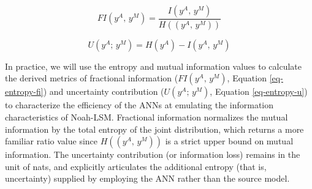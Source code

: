 \begin{equation}\label{eq-entropy-fi}
    FI(y^A,\,y^M) = \frac{I(y^A,\,y^M)}{H((y^A,\,y^M))} %
\end{equation}

\begin{equation}\label{eq-entropy-u}
    U(y^A;\,y^M) = H(y^A) - I(y^A,\,y^M) %
\end{equation}

In practice, we will use the entropy and mutual information values to calculate the derived metrics of fractional information ($FI(y^A,\,y^M)$, Equation \ref{eq-entropy-fi}) and uncertainty contribution ($U(y^A;\,y^M)$, Equation \ref{eq-entropy-u}) to characterize the efficiency of the ANNs at emulating the information characteristics of Noah-LSM. Fractional information normalizes the mutual information by the total entropy of the joint distribution, which returns a more familiar ratio value since $H((y^A,\,y^M))$ is a strict upper bound on mutual information. The uncertainty contribution (or information loss) remains in the unit of nats, and explicitly articulates the additional entropy (that is, uncertainty) supplied by employing the ANN rather than the source model.
